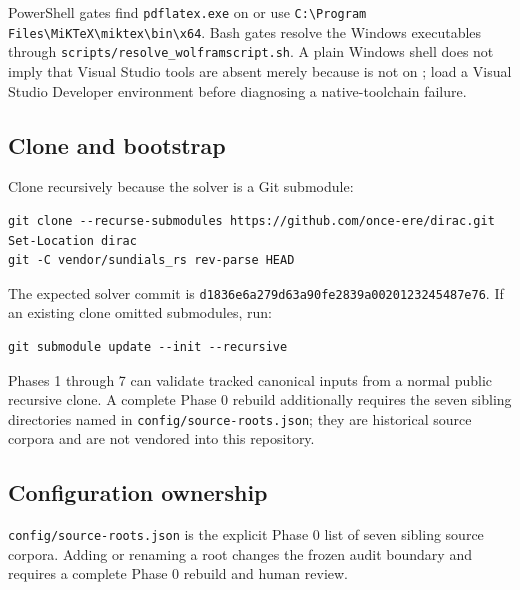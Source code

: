 \documentclass[11pt]{article}
\begin{document}
PowerShell gates find \texttt{pdflatex\allowbreak{}.exe} on \texttt{} or use \texttt{C:\textbackslash{}Progr\allowbreak{}am Files\allowbreak{}\textbackslash{}MiKTeX\textbackslash{}\allowbreak{}miktex\textbackslash{}b\allowbreak{}in\textbackslash{}x64}. Bash gates resolve the Windows executables through \texttt{scripts/\allowbreak{}resolve\_\allowbreak{}wolframs\allowbreak{}cript.sh}. A plain Windows shell does not imply that Visual Studio tools are absent merely because \texttt{} is not on \texttt{}; load a Visual Studio Developer environment before diagnosing a native-toolchain failure.

\subsection{Clone and bootstrap}

Clone recursively because the solver is a Git submodule:

\begin{Verbatim}[fontsize=\small]
git clone --recurse-submodules https://github.com/once-ere/dirac.git
Set-Location dirac
git -C vendor/sundials_rs rev-parse HEAD
\end{Verbatim}

The expected solver commit is \texttt{d1836e6a\allowbreak{}279d63a9\allowbreak{}0fe2839a\allowbreak{}00201232\allowbreak{}45487e76}. If an existing clone omitted submodules, run:

\begin{Verbatim}[fontsize=\small]
git submodule update --init --recursive
\end{Verbatim}

Phases 1 through 7 can validate tracked canonical inputs from a normal public recursive clone. A complete Phase 0 rebuild additionally requires the seven sibling directories named in \texttt{config/s\allowbreak{}ource-ro\allowbreak{}ots.json}; they are historical source corpora and are not vendored into this repository.

\subsection{Configuration ownership}

\texttt{config/s\allowbreak{}ource-ro\allowbreak{}ots.json} is the explicit Phase 0 list of seven sibling source corpora. Adding or renaming a root changes the frozen audit boundary and requires a complete Phase 0 rebuild and human review.
\end{document}
